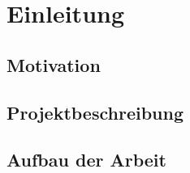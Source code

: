 \chapter{Einleitung}
\label{cha:Einleitung}
	
 		

\section{Motivation}


\section{Projektbeschreibung}


\section{Aufbau der Arbeit}

